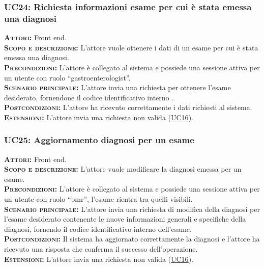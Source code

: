 \subsubsection{UC24: Richiesta informazioni esame per cui è stata emessa una diagnosi}
\label{sec:UC24}
\textsc{\textbf{Attori:}} Front end.\\
\textsc{\textbf{Scopo e descrizione:}} L'attore vuole ottenere i dati di un esame per cui è stata emessa una diagnosi.\\
\textsc{\textsc{\textbf{Precondizioni:}}} L'attore è collegato al sistema e possiede una sessione attiva per un utente con ruolo ``gastroenterologist''.\\
\textsc{\textbf{Scenario principale:}}  L'attore invia una richiesta per ottenere l'esame desiderato, fornendone il codice identificativo interno .\\
\textsc{\textbf{Postcondizioni:}} L'attore ha ricevuto correttamente i dati richiesti al sistema.\\
\textsc{\textbf{Estensioni:}} L'attore invia una richiesta non valida (\hyperref[sec:UC16]{UC16}).

\subsubsection{UC25: Aggiornamento diagnosi per un esame}
\label{sec:UC25}
\textsc{\textbf{Attori:}} Front end.\\
\textsc{\textbf{Scopo e descrizione:}} L'attore vuole modificare la diagnosi emessa per un esame.\\
\textsc{\textsc{\textbf{Precondizioni:}}} L'attore è collegato al sistema e possiede una sessione attiva per un utente con ruolo ``bmr'', l'esame rientra tra quelli visibili.\\
\textsc{\textbf{Scenario principale:}}  L'attore invia una richiesta di modifica della diagnosi per l'esame desiderato contenente le nuove informazioni generali e specifiche della diagnosi, fornendo il codice identificativo interno dell'esame.\\
\textsc{\textbf{Postcondizioni:}} Il sistema ha aggiornato correttamente la diagnosi e l'attore ha ricevuto una risposta che conferma il successo dell'operazione.\\
\textsc{\textbf{Estensioni:}} L'attore invia una richiesta non valida (\hyperref[sec:UC16]{UC16}).

